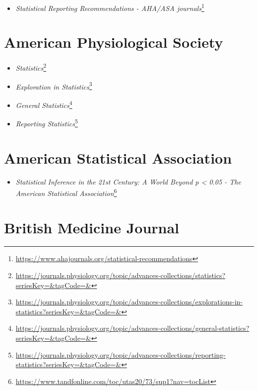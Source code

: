 \documentclass[
  a4paper,
]{book}
\providecommand{\tightlist}{%
  \setlength{\itemsep}{0pt}\setlength{\parskip}{0pt}}
\renewcommand{\href}[2]{#2\footnote{\url{#1}}}
\begin{document}
\begin{itemize}
\tightlist
\item
  \href{https://www.ahajournals.org/statistical-recommendations}{\emph{Statistical Reporting Recommendations - AHA/ASA journals}}
\end{itemize}

\hypertarget{american-physiological-society}{%
\section*{American Physiological Society}\label{american-physiological-society}}

\begin{itemize}
\item
  \href{https://journals.physiology.org/topic/advances-collections/statistics?seriesKey=\&tagCode=\&}{\emph{Statistics}}
\item
  \href{https://journals.physiology.org/topic/advances-collections/explorations-in-statistics?seriesKey=\&tagCode=\&}{\emph{Exploration in Statistics}}
\item
  \href{https://journals.physiology.org/topic/advances-collections/general-statistics?seriesKey=\&tagCode=\&}{\emph{General Statistics}}
\item
  \href{https://journals.physiology.org/topic/advances-collections/reporting-statistics?seriesKey=\&tagCode=\&}{\emph{Reporting Statistics}}
\end{itemize}

\hypertarget{american-statistical-association}{%
\section*{American Statistical Association}\label{american-statistical-association}}

\begin{itemize}
\tightlist
\item
  \href{https://www.tandfonline.com/toc/utas20/73/sup1?nav=tocList}{\emph{Statistical Inference in the 21st Century: A World Beyond p \textless{} 0.05 - The American Statistical Association}}
\end{itemize}

\hypertarget{british-medicine-journal}{%
\section*{British Medicine Journal}\label{british-medicine-journal}}
\end{document}
